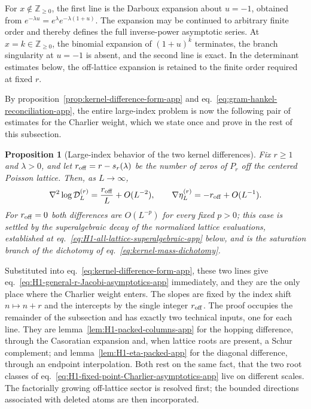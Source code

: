 \documentclass[a4paper,11pt]{article}
\def\ee{e}%
\newtheorem{proposition}{Proposition}[section]
\theoremstyle{definition}
\theoremstyle{remark}
\newcommand{\ee}{\mathrm e}
\begin{document}
For $x\notin\mathbb Z_{\ge0}$, the first line is the Darboux expansion about $u=-1$, obtained from $\ee^{-\lambda u}=\ee^\lambda\ee^{-\lambda(1+u)}$. The expansion may be continued to arbitrary finite order and thereby defines the full inverse-power asymptotic series. At $x=k\in\mathbb Z_{\ge0}$, the binomial expansion of $(1+u)^k$ terminates, the branch singularity at $u=-1$ is absent, and the second line is exact. In the determinant estimates below, the off-lattice expansion is retained to the finite order required at fixed $r$.

By proposition~\ref{prop:kernel-difference-form-app} and
eq.~\eqref{eq:gram-hankel-reconciliation-app}, the entire large-index problem is now the following
pair of estimates for the Charlier weight, which we state once and prove in the rest of this
subsection.

\begin{proposition}[Large-index behavior of the two kernel differences]
\label{prop:charlier-difference-estimates-app}
Fix $r\ge1$ and $\lambda>0$, and let $r_{\rm off}=r-s_r(\lambda)$ be the number of zeros of $P_r$
off the centered Poisson lattice. Then, as $L\to\infty$,
\begin{equation}
   \nabla^2\log\mathcal D_L^{(r)}=\frac{r_{\rm off}}{L}+O(L^{-2}),
   \qquad
   \nabla\eta_L^{(r)}=-r_{\rm off}+O(L^{-1}).
   \label{eq:charlier-difference-estimates-app}
\end{equation}
For $r_{\rm off}=0$ both differences are $O(L^{-p})$ for every fixed $p>0$; this case is settled by
the superalgebraic decay of the normalized lattice evaluations, established at
eq.~\eqref{eq:H1-all-lattice-superalgebraic-app} below, and is the saturation branch of the
dichotomy of eq.~\eqref{eq:kernel-mass-dichotomy}.
\end{proposition}

Substituted into eq.~\eqref{eq:kernel-difference-form-app}, these two lines give
eq.~\eqref{eq:H1-general-r-Jacobi-asymptotics-app} immediately, and they are the only place where
the Charlier weight enters. The slopes are fixed by the index shift $n\mapsto n+r$ and the
intercepts by the single integer $r_{\rm off}$. The proof occupies the remainder of the
subsection and has exactly two technical inputs, one for each line. They are
lemma~\ref{lem:H1-packed-columns-app} for the hopping difference, through the Casoratian
expansion and, when lattice roots are present, a Schur complement; and
lemma~\ref{lem:H1-eta-packed-app} for the diagonal difference, through an endpoint
interpolation. Both rest on the same fact, that the two root classes of
eq.~\eqref{eq:H1-fixed-point-Charlier-asymptotics-app} live on different scales. The factorially
growing off-lattice sector is resolved first; the bounded directions associated with deleted atoms
are then incorporated.
\end{document}
